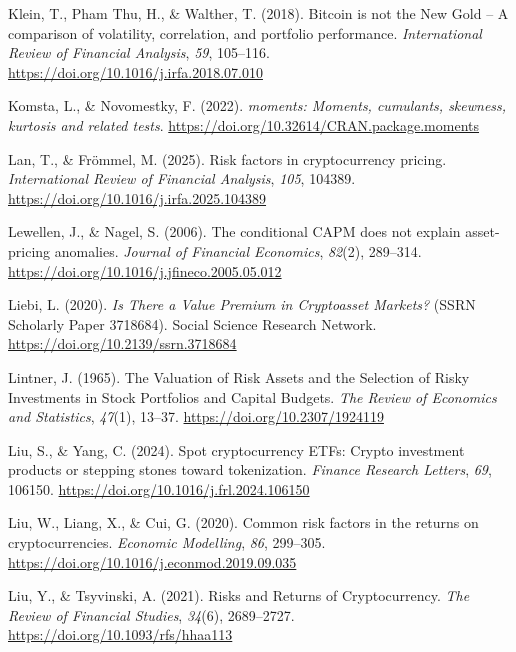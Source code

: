\documentclass[
  12pt,
  a4paper,
  openany]{scrbook}
\newlength{\cslhangindent}
\newenvironment{CSLReferences}[2] %
 {\begin{list}{}{%
  \setlength{\itemindent}{0pt}
  \setlength{\leftmargin}{0pt}
  \setlength{\parsep}{0pt}
  \ifodd #1
   \setlength{\leftmargin}{\cslhangindent}
   \setlength{\itemindent}{-1\cslhangindent}
  \fi
  \setlength{\itemsep}{#2\baselineskip}}}
 {\end{list}}
\begin{document}
\begin{CSLReferences}{1}{0}
Klein, T., Pham Thu, H., \& Walther, T. (2018). Bitcoin is not the New
Gold -- A comparison of volatility, correlation, and portfolio
performance. \emph{International Review of Financial Analysis},
\emph{59}, 105--116. \url{https://doi.org/10.1016/j.irfa.2018.07.010}

Komsta, L., \& Novomestky, F. (2022). \emph{{moments}: Moments,
cumulants, skewness, kurtosis and related tests}.
\url{https://doi.org/10.32614/CRAN.package.moments}

Lan, T., \& Frömmel, M. (2025). Risk factors in cryptocurrency pricing.
\emph{International Review of Financial Analysis}, \emph{105}, 104389.
\url{https://doi.org/10.1016/j.irfa.2025.104389}

Lewellen, J., \& Nagel, S. (2006). The conditional CAPM does not explain
asset-pricing anomalies. \emph{Journal of Financial Economics},
\emph{82}(2), 289--314.
\url{https://doi.org/10.1016/j.jfineco.2005.05.012}

Liebi, L. (2020). \emph{Is There a Value Premium in Cryptoasset
Markets?} (SSRN Scholarly Paper 3718684). Social Science Research
Network. \url{https://doi.org/10.2139/ssrn.3718684}

Lintner, J. (1965). The Valuation of Risk Assets and the Selection of
Risky Investments in Stock Portfolios and Capital Budgets. \emph{The
Review of Economics and Statistics}, \emph{47}(1), 13--37.
\url{https://doi.org/10.2307/1924119}

Liu, S., \& Yang, C. (2024). Spot cryptocurrency ETFs: Crypto investment
products or stepping stones toward tokenization. \emph{Finance Research
Letters}, \emph{69}, 106150.
\url{https://doi.org/10.1016/j.frl.2024.106150}

Liu, W., Liang, X., \& Cui, G. (2020). Common risk factors in the
returns on cryptocurrencies. \emph{Economic Modelling}, \emph{86},
299--305. \url{https://doi.org/10.1016/j.econmod.2019.09.035}

Liu, Y., \& Tsyvinski, A. (2021). Risks and Returns of Cryptocurrency.
\emph{The Review of Financial Studies}, \emph{34}(6), 2689--2727.
\url{https://doi.org/10.1093/rfs/hhaa113}


\end{CSLReferences}
\end{document}
